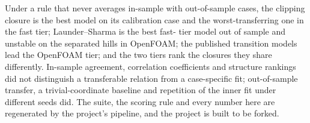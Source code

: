 \documentclass[lineno]{jfm}
\begin{document}

Under a rule that never averages in-sample with out-of-sample cases, the
clipping closure is the best model on its calibration case and the
worst-transferring one in the fast tier; Launder--Sharma is the best fast-
tier model out of sample and unstable on the separated hills in OpenFOAM;
the published transition models lead the OpenFOAM tier; and the two tiers
rank the closures they share differently. In-sample agreement, correlation
coefficients and structure rankings did not distinguish a transferable
relation from a case-specific fit; out-of-sample transfer, a
trivial-coordinate baseline and repetition of the inner fit under different
seeds did. The suite, the scoring rule and every number here are
regenerated by the project's pipeline, and the project is built to be
forked.



\end{document}
